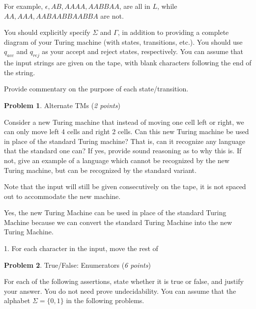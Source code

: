\documentclass[11pt]{article}
\theoremstyle{definition}
\theoremstyle{theorem}
\newtheorem{prob}{Problem}
\newcommand{\solution}{\medskip\noindent{\color{blue}\textbf{Solution:}}}
\begin{document}
For example, $ \epsilon, AB, AAAA, AABBAA$, are all in $L$, while $AA, AAA, AABAABBAABBA$ are not.

You should explicitly specify $\Sigma$ and $\Gamma$, in addition to providing a complete diagram of your Turing machine (with states, transitions, etc.). You should use $q_{acc}$ and $q_{rej}$ as your accept and reject states, respectively. You can assume that the input strings are given on the tape, with blank characters following the end of the string.

Provide commentary on the purpose of each state/transition.

\solution






\newpage

\begin{prob} Alternate TMs (\emph{2 points})\end{prob}

Consider a new Turing machine that instead of moving one cell left or right, we can only move left 4 cells and right 2 cells. Can this new Turing machine be used in place of the standard Turing machine? That is, can it recognize any language that the standard one can? If yes, provide sound reasoning as to why this is. If not, give an example of a language which cannot be recognized by the new Turing machine, but can be recognized by the standard variant.

Note that the input will still be given consecutively on the tape, it is not spaced out to accommodate the new machine.

\solution

Yes, the new Turing Machine can be used in place of the standard Turing Machine because we can convert the standard Turing Machine into the new Turing Machine.

1. For each character in the input, move the rest of 


\newpage

\begin{prob} True/False: Enumerators (\emph{6 points})\end{prob}


For each of the following assertions, state whether it is true or false, and justify your answer. You do not need prove undecidability. You can assume that the alphabet $\Sigma = \{0, 1\}$ in the following problems.
\end{document}
